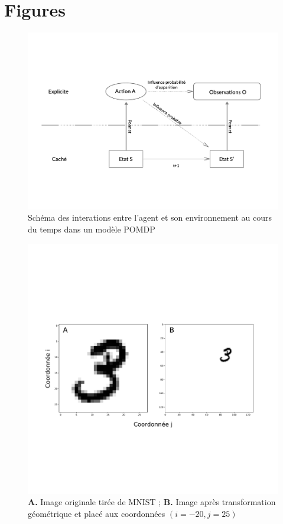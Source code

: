 
\chapter{Figures} %

\label{Figures} %

\begin{figure}[th]
\centering
\includegraphics[scale=0.45]{Figures/POMDP}
\decoRule %
\caption[Figure]{Schéma des interations entre l'agent et son environnement au cours du temps dans un modèle POMDP}
\label{fig:POMDP}
\end{figure}

\begin{figure}[th]
\centering
\includegraphics[scale=0.3]{Figures/mnist_reshape}
\decoRule %
\caption[Figure]{\textbf{A.} Image originale tirée de MNIST ; \textbf{B.} Image après transformation géométrique et placé aux coordonnées $(i=-20,j=25)$}
\label{fig:mnist_reshape}
\end{figure}

